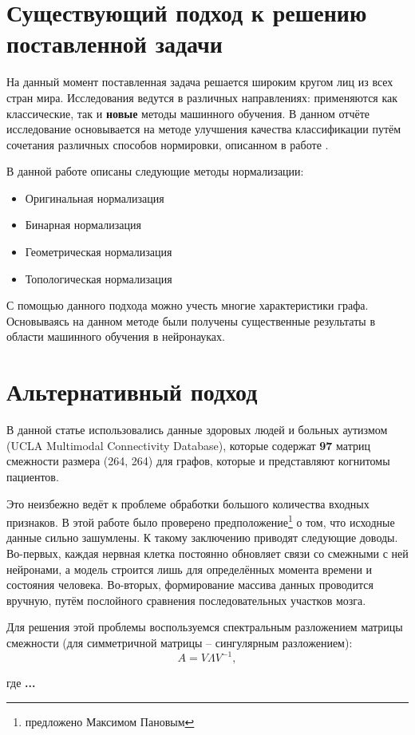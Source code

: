 \documentclass{urticle}
\newcommand{\mys}[1]{\newpage\section*{#1}}
\begin{document}
\mys{Существующий подход к решению поставленной задачи}
На данный момент поставленная задача решается широким кругом лиц из всех стран мира. Исследования ведутся в различных направлениях: применяются как классические, так и \textbf{новые} методы машинного обучения. В данном отчёте исследование основывается на методе улучшения качества классификации путём сочетания различных способов нормировки, описанном в работе \cite{article1}. 

В данной работе описаны следующие методы нормализации:
\begin{itemize}
	\item Оригинальная нормализация
	\item Бинарная нормализация
	\item Геометрическая нормализация
	\item Топологическая нормализация			
\end{itemize}

С помощью данного подхода можно учесть многие характеристики графа. Основываясь на данном методе были получены существенные результаты \cite{article1} в области машинного обучения в нейронауках.

\section*{Альтернативный подход}
В данной статье использовались данные здоровых людей и больных аутизмом (UCLA Multimodal Connectivity Database), которые содержат \textbf{97} матриц смежности размера (264, 264) для графов, которые и представляют когнитомы пациентов.

Это неизбежно ведёт к проблеме обработки большого количества входных признаков. В этой работе было проверено предположение\footnote{предложено Максимом Пановым} о том, что исходные данные сильно зашумлены. К такому заключению приводят следующие доводы. Во-первых, каждая нервная клетка постоянно обновляет связи со смежными с ней нейронами,  а модель строится лишь для определённых момента времени и состояния человека. Во-вторых, формирование массива данных проводится вручную, путём послойного сравнения последовательных участков мозга.

Для решения этой проблемы воспользуемся спектральным разложением матрицы смежности (для симметричной матрицы -- сингулярным разложением):
\begin{equation}
	\label{SVD}
	A = V \Lambda V^{-1}, 
\end{equation} 

где \textbf{...}
\end{document}
